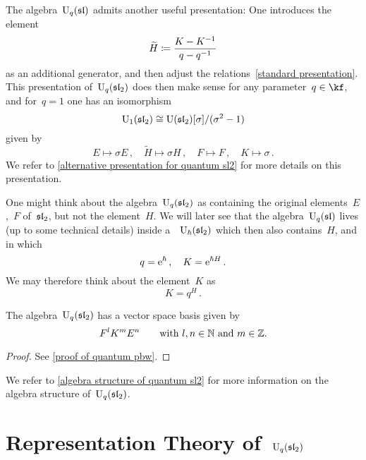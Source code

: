 \documentclass[a4paper, 11pt, oneside]{scrartcl}
\begin{document}
\begin{remark}[The case~$q = 1$]
  \label{quantum U1}
  The algebra~$\operatorname{U}_q(\mathfrak{sl})$ admits another useful presentation:
  One introduces the element
  \[
    \widetilde{H}
    \coloneqq
    \frac{K - K^{-1}}{q - q^{-1}}
  \]
  as an additional generator, and then adjust the relations~\eqref{standard presentation}.
  This presentation of~$\operatorname{U}_q(\mathfrak{sl}_2)$ does then make sense for any parameter~$q \in \kf$, and for~$q = 1$ one has an isomorphism
  \[
    \operatorname{U}_1(\mathfrak{sl}_2)
    \cong
    \operatorname{U}(\mathfrak{sl}_2)[\sigma]/(\sigma^2 - 1)
  \]
  given by
  \begin{equation}
    \label{isomorphism for U1}
    E \mapsto \sigma E \,,
    \quad
    \widetilde{H} \mapsto \sigma H \,,
    \quad
    F \mapsto F \,,
    \quad
    K \mapsto \sigma \,.
  \end{equation}
  We refer to \cref{alternative presentation for quantum sl2} for more details on this presentation.
\end{remark}

\begin{remark}
  One might think about the algebra~$\operatorname{U}_q(\mathfrak{sl}_2)$ as containing the original elements~$E$,~$F$ of~$\mathfrak{sl}_2$, but not the element~$H$.
  We will later see that the algebra~$\operatorname{U}_q(\mathfrak{sl})$ lives (up to some technical details) inside a~\algebra{$\kfhbar$}~$\operatorname{U}_{\hbar}(\mathfrak{sl}_2)$ which then also contains~$H$, and in which
  \[
    q = \mathrm{e}^{\hbar} \,,
    \quad
    K = \mathrm{e}^{\hbar H} \,.
  \]
  We may therefore think about the element~$K$ as
  \[
    K
    =
    q^H \,.
  \]
\end{remark}

\begin{theorem}
  \label{quantum pbw}
  The algebra~$\operatorname{U}_q(\mathfrak{sl}_2)$ has a vector space basis given by
  \[
    F^l K^m E^n
    \qquad
    \text{with~$l, n \in \mathbb{N}$ and~$m \in \mathbb{Z}$.} 
  \]
\end{theorem}

\begin{proof}
  See \cref{proof of quantum pbw}.
\end{proof}

We refer to \cref{algebra structure of quantum sl2} for more information on the algebra structure of~$\operatorname{U}_q(\mathfrak{sl}_2)$.





\section{Representation Theory of~\texorpdfstring{$\operatorname{U}_q(\mathfrak{sl}_2)$}{Uq(sl2)}}
\end{document}
